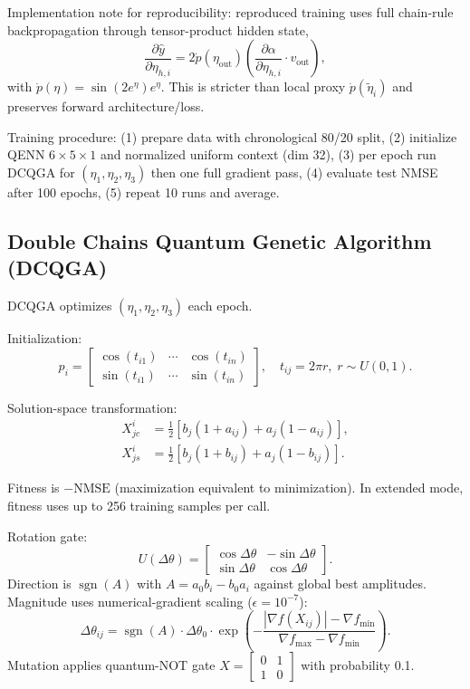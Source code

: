\documentclass[conference]{IEEEtran}
\begin{document}
Implementation note for reproducibility: reproduced training uses full chain-rule backpropagation through tensor-product hidden state,
\begin{equation}
\frac{\partial\hat y}{\partial\eta_{h,i}} = 2\dot p(\eta_{\text{out}})\left(\frac{\partial\alpha}{\partial\eta_{h,i}}\cdot v_{\text{out}}\right), \label{eq23}
\end{equation}
with $\dot p(\eta)=\sin(2e^\eta)e^\eta$. This is stricter than local proxy $\dot p(\tilde\eta_i)$ and preserves forward architecture/loss.

Training procedure: (1) prepare data with chronological 80/20 split, (2) initialize QENN $6\times5\times1$ and normalized uniform context (dim 32), (3) per epoch run DCQGA for $(\eta_1,\eta_2,\eta_3)$ then one full gradient pass, (4) evaluate test NMSE after 100 epochs, (5) repeat 10 runs and average.

\subsection{Double Chains Quantum Genetic Algorithm (DCQGA)}
DCQGA optimizes $(\eta_1,\eta_2,\eta_3)$ each epoch.

Initialization:
\begin{equation}
p_i=\begin{bmatrix}\cos(t_{i1})&\cdots&\cos(t_{in})\\ \sin(t_{i1})&\cdots&\sin(t_{in})\end{bmatrix},\quad t_{ij}=2\pi r,\;r\sim U(0,1). \label{eq24}
\end{equation}

Solution-space transformation:
\begin{align}
X^i_{jc}&=\frac{1}{2}\left[b_j(1+a_{ij})+a_j(1-a_{ij})\right], \label{eq25}\\
X^i_{js}&=\frac{1}{2}\left[b_j(1+b_{ij})+a_j(1-b_{ij})\right]. \label{eq26}
\end{align}

Fitness is $-\text{NMSE}$ (maximization equivalent to minimization). In extended mode, fitness uses up to 256 training samples per call.

Rotation gate:
\begin{equation}
U(\Delta\theta)=\begin{bmatrix}\cos\Delta\theta & -\sin\Delta\theta\\ \sin\Delta\theta & \cos\Delta\theta\end{bmatrix}. \label{eq27}
\end{equation}
Direction is $\operatorname{sgn}(A)$ with $A=a_0b_i-b_0a_i$ against global best amplitudes. Magnitude uses numerical-gradient scaling ($\epsilon=10^{-7}$):
\begin{equation}
\Delta\theta_{ij}=\operatorname{sgn}(A)\cdot\Delta\theta_0\cdot\exp\!\left(-\frac{|\nabla f(X_{ij})|-\nabla f_{\min}}{\nabla f_{\max}-\nabla f_{\min}}\right). \label{eq28}
\end{equation}
Mutation applies quantum-NOT gate $X=\begin{bmatrix}0&1\\1&0\end{bmatrix}$ with probability 0.1.
\end{document}
